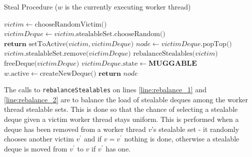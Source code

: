 \documentclass[bsc,frontabs,singlespacing,parskip,deptreport,normalheadings]{infthesis}
\begin{document}
\begin{algorithm}
\caption{Steal Procedure ($w$ is the currently executing worker thread)}\label{alg:steal}
\begin{algorithmic}[1]
            \State $victim \gets \text{chooseRandomVictim()} $
                \label{line:choose_random_victim}
            \State $ victimDeque \gets victim \text{.stealableSet.chooseRandom()} $
                \label{line:choose_random}
                \State $ \textbf{return } \text{setToActive(} victim, victimDeque \text{)}$ 
            \EndIf
            \State $ node \gets victimDeque \text{.popTop()} $
                \State $ victim \text{.stealableSet.remove(} victimDeque \text{)} $
                \State $ \text{rebalanceStealables(} victim \text{)} $
                    \label{line:rebalance_1}
                    \State $ \text{freeDeque(} victimDeque \text{)} $
                \EndIf
                \State $victimDeque\text{.state} \gets \textbf{MUGGABLE}$
            \EndIf
                    \State $w \text{.active} \gets \text{createNewDeque()}$
                \EndIf
                \State $ \textbf{return } node $
            \EndIf
        \EndWhile
    \EndFunction
\end{algorithmic}
\end{algorithm}

The calls to \texttt{rebalanceStealables} on lines \ref{line:rebalance_1} and
\ref{line:rebalance_2} are to balance the load of stealable deques among the
worker thread stealable sets. This is done so that the chance of selecting a
stealable deque given a victim worker thread stays uniform. This is performed
when a deque has been removed from a worker thread \(v\)'s stealable set - it
randomly chooses another victim \(v^\prime\) and if \(v = v^\prime\) nothing is
done, otherwise a stealable deque is moved from \(v^\prime\) to \(v\) if
\(v^\prime\) has one.
\end{document}
